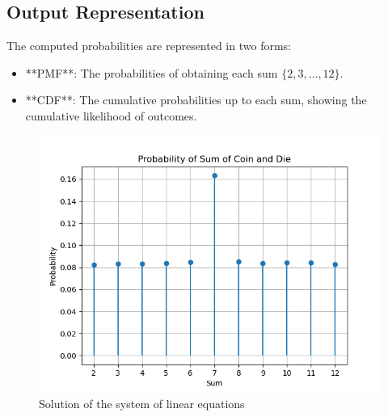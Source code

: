 \documentclass[journal]{IEEEtran}
\begin{document}
\subsection*{Output Representation}
The computed probabilities are represented in two forms:
\begin{itemize}
    \item **PMF**: The probabilities of obtaining each sum $\{2, 3, \ldots, 12\}$.
    \item **CDF**: The cumulative probabilities up to each sum, showing the cumulative likelihood of outcomes.
\end{itemize}
\begin{figure}[!ht]
		\centering
		\includegraphics[width=\columnwidth]{figs/Figure_1.png}
		\caption{Solution of the system of linear equations}
		\label{stemplot}
	\end{figure}
\end{document}
